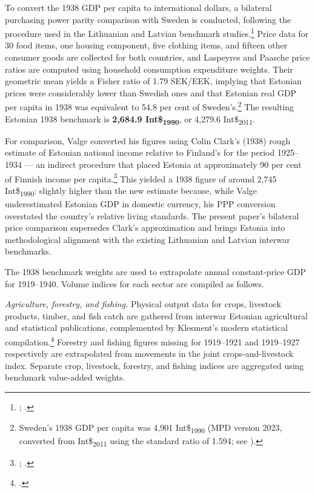 \documentclass[12pt,a4paper]{article}
\newcommand{\intlnineteen}{Int\$\textsubscript{1990}}   %
\newcommand{\intltwenty}{Int\$\textsubscript{2011}}     %
\newcommand{\eek}{EEK}                                  %
\newcommand{\sek}{SEK}                                  %
\begin{document}
To convert the 1938 GDP per capita to international dollars, a bilateral purchasing power parity comparison with Sweden is conducted, following the procedure used in the Lithuanian and Latvian benchmark studies.\footnote{\autocite{klimantas2019}; \autocite{norkuslatvia1935}.} Price data for 30 food items, one housing component, five clothing items, and fifteen other consumer goods are collected for both countries, and Laspeyres and Paasche price ratios are computed using household consumption expenditure weights. Their geometric mean yields a Fisher ratio of 1.79 \sek/\eek, implying that Estonian prices were considerably lower than Swedish ones and that Estonian real GDP per capita in 1938 was equivalent to 54.8 per cent of Sweden's.\footnote{Sweden's 1938 GDP per capita was 4,901 \intlnineteen{} (MPD version 2023, converted from \intltwenty{} using the standard ratio of 1.594; see \autocite[12]{bolt_zanden_newgdp2021}).} The resulting Estonian 1938 benchmark is \textbf{2,684.9 \intlnineteen{}}, or 4,279.6 \intltwenty{}.

For comparison, Valge converted his figures using Colin Clark's (1938) rough estimate of Estonian national income relative to Finland's for the period 1925--1934 — an indirect procedure that placed Estonia at approximately 90 per cent of Finnish income per capita.\footnote{\autocite[2725]{valge2003all}; \autocite[60]{clark1938}.} This yielded a 1938 figure of around 2,745 \intlnineteen{}: slightly higher than the new estimate because, while Valge underestimated Estonian GDP in domestic currency, his PPP conversion overstated the country's relative living standards. The present paper's bilateral price comparison supersedes Clark's approximation and brings Estonia into methodological alignment with the existing Lithuanian and Latvian interwar benchmarks.


The 1938 benchmark weights are used to extrapolate annual constant-price GDP for 1919--1940. Volume indices for each sector are compiled as follows.

\textit{Agriculture, forestry, and fishing.} Physical output data for crops, livestock products, timber, and fish catch are gathered from interwar Estonian agricultural and statistical publications, complemented by Klesment's modern statistical compilation.\footnote{\autocite{klesment2007}.} Forestry and fishing figures missing for 1919--1921 and 1919--1927 respectively are extrapolated from movements in the joint crops-and-livestock index. Separate crop, livestock, forestry, and fishing indices are aggregated using benchmark value-added weights.
\end{document}
